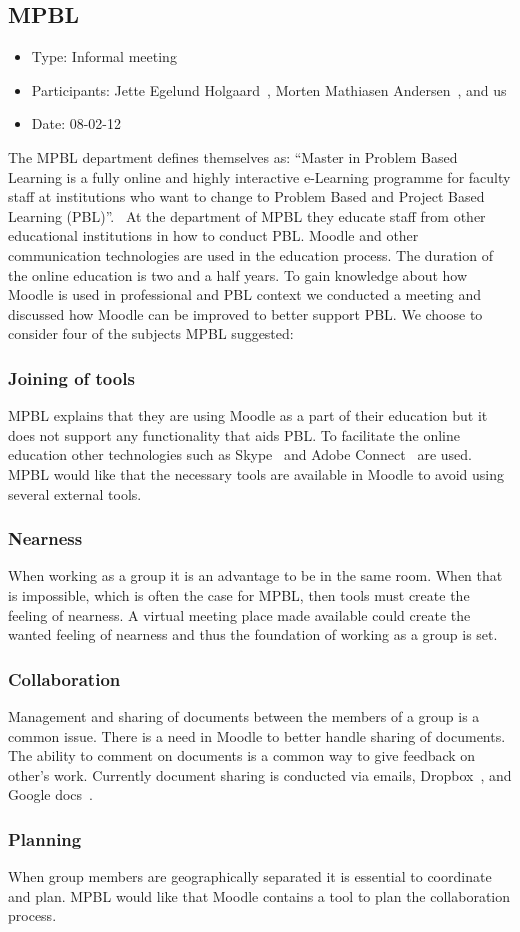 \subsection{MPBL}
\label{sub:mpblInterview}
\begin{itemize}
	\item Type: Informal meeting
	\item Participants: Jette Egelund Holgaard~\cite{jette}, Morten Mathiasen Andersen~\cite{morten}, and us
	\item Date: 08-02-12
\end{itemize}
The MPBL department defines themselves as:
``Master in Problem Based Learning is a fully online and highly interactive e-Learning programme for faculty staff at institutions who want to change to Problem Based and Project Based Learning (PBL)''.~\cite{mpbl}
At the department of MPBL they educate staff from other educational institutions in how to conduct PBL.
Moodle and other communication technologies are used in the education process. 
The duration of the online education is two and a half years.
To gain knowledge about how Moodle is used in professional and PBL context we conducted a meeting and discussed how Moodle can be improved to better support PBL. 
We choose to consider four of the subjects MPBL suggested:

\subsubsection{Joining of tools} MPBL explains that they are using Moodle as a part of their education but it does not support any functionality that aids PBL. 
To facilitate the online education other technologies such as Skype~\cite{skype} and Adobe Connect~\cite{adobe} are used. 
MPBL would like that the necessary tools are available in Moodle to avoid using several external tools.     

\subsubsection{Nearness} When working as a group it is an advantage to be in the same room.
When that is impossible, which is often the case for MPBL, then tools must create the feeling of nearness. 
A virtual meeting place made available could create the wanted feeling of nearness and thus the foundation of working as a group is set.

\subsubsection{Collaboration} Management and sharing of documents between the members of a group is a common issue. 
There is a need in Moodle to better handle sharing of documents. 
The ability to comment on documents is a common way to give feedback on other's work. 
Currently document sharing is conducted via emails, Dropbox~\cite{dropbox}, and Google docs~\cite{googledocs}.

\subsubsection{Planning} When group members are geographically separated it is essential to coordinate and plan.
MPBL would like that Moodle contains a tool to plan the collaboration process.